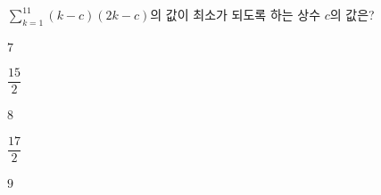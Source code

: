 $\displaystyle\sum_{k=1}^{11}(k-c)(2k-c)$의 값이 최소가 되도록 하는 상수 $c$의 값은?
\begin{choices32}{\rule[-3ex]{0pt}{8ex}$7$}{\rule[-3ex]{0pt}{8ex}$\dfrac{15}{2}$}{\rule[-3ex]{0pt}{8ex}$8$}{\rule[-3ex]{0pt}{8ex}$\dfrac{17}{2}$}{\rule[-3ex]{0pt}{8ex}$9$}\end{choices32}
